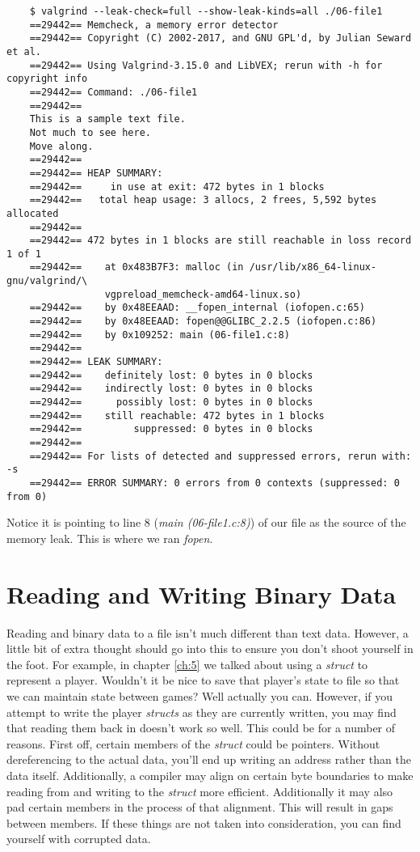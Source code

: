 \documentclass[../main.tex]{subfiles}
\begin{document}
	\begin{verbatim}
	$ valgrind --leak-check=full --show-leak-kinds=all ./06-file1 
	==29442== Memcheck, a memory error detector
	==29442== Copyright (C) 2002-2017, and GNU GPL'd, by Julian Seward et al.
	==29442== Using Valgrind-3.15.0 and LibVEX; rerun with -h for copyright info
	==29442== Command: ./06-file1
	==29442== 
	This is a sample text file.
	Not much to see here.
	Move along.
	==29442== 
	==29442== HEAP SUMMARY:
	==29442==     in use at exit: 472 bytes in 1 blocks
	==29442==   total heap usage: 3 allocs, 2 frees, 5,592 bytes allocated
	==29442== 
	==29442== 472 bytes in 1 blocks are still reachable in loss record 1 of 1
	==29442==    at 0x483B7F3: malloc (in /usr/lib/x86_64-linux-gnu/valgrind/\
				 vgpreload_memcheck-amd64-linux.so)
	==29442==    by 0x48EEAAD: __fopen_internal (iofopen.c:65)
	==29442==    by 0x48EEAAD: fopen@@GLIBC_2.2.5 (iofopen.c:86)
	==29442==    by 0x109252: main (06-file1.c:8)
	==29442== 
	==29442== LEAK SUMMARY:
	==29442==    definitely lost: 0 bytes in 0 blocks
	==29442==    indirectly lost: 0 bytes in 0 blocks
	==29442==      possibly lost: 0 bytes in 0 blocks
	==29442==    still reachable: 472 bytes in 1 blocks
	==29442==         suppressed: 0 bytes in 0 blocks
	==29442== 
	==29442== For lists of detected and suppressed errors, rerun with: -s
	==29442== ERROR SUMMARY: 0 errors from 0 contexts (suppressed: 0 from 0)
	\end{verbatim}
	
	Notice it is pointing to line 8 (\textit{main (06-file1.c:8)}) of our file as the source of the memory leak.  This is where we ran \textit{fopen}.
	
	\section{Reading and Writing Binary Data}
	
	Reading and binary data to a file isn't much different than text data.  However, a little bit of extra thought should go into this to ensure you don't shoot yourself in the foot.  For example, in chapter \ref{ch:5} we talked about using a \textit{struct} to represent a player.  Wouldn't it be nice to save that player's state to file so that we can maintain state between games?  Well actually you can.  However, if you attempt to write the player \textit{structs} as they are currently written, you may find that reading them back in doesn't work so well.  This could be for a number of reasons.  First off, certain members of the \textit{struct} could be pointers.  Without dereferencing to the actual data, you'll end up writing an address rather than the data itself.  Additionally, a compiler may align on certain byte boundaries to make reading from and writing to the \textit{struct} more efficient. Additionally it may also pad certain members in the process of that alignment.  This will result in gaps between members.  If these things are not taken into consideration, you can find yourself with corrupted data.
	
\end{document}
